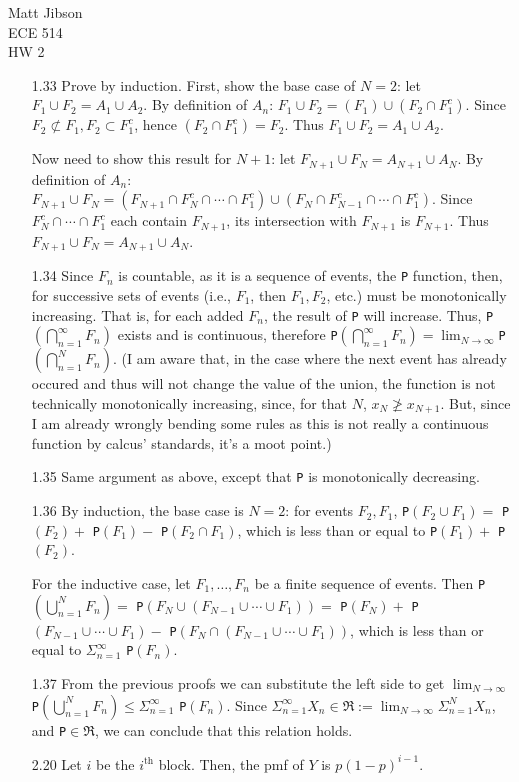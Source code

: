 \documentclass{article}
\begin{document}
\begin{flushright}
Matt Jibson \\
ECE 514 \\
HW 2
\end{flushright}

\begin{itemize}
	\item[1.33]
		Prove by induction. First, show the base case of $N=2$: let $F_1 \cup F_2 = A_1 \cup A_2$. By definition of $A_n$: $F_1 \cup F_2 = (F_1) \cup (F_2 \cap F_1^c)$. Since $F_2 \not \subset F_1, F_2 \subset F_1^c$, hence $(F_2 \cap F_1^c) = F_2$. Thus $F_1 \cup F_2 = A_1 \cup A_2$.

		Now need to show this result for $N+1$: let $F_{N+1} \cup F_N = A_{N+1} \cup A_N$. By definition of $A_n$: $F_{N+1} \cup F_N = (F_{N+1} \cap F_N^c \cap \cdots \cap F_1^c) \cup (F_N \cap F_{N-1}^c \cap \cdots \cap F_1^c)$. Since $F_N^c \cap \cdots \cap F_1^c$ each contain $F_{N+1}$, its intersection with $F_{N+1}$ is $F_{N+1}$. Thus $F_{N+1} \cup F_N = A_{N+1} \cup A_N$.
	\item[1.34]
		Since $F_n$ is countable, as it is a sequence of events, the \texttt{P} function, then, for successive sets of events (i.e., ${F_1}$, then ${F_1, F_2}$, etc.) must be monotonically increasing. That is, for each added $F_n$, the result of \texttt{P} will increase. Thus, \texttt{P}$(\bigcap_{n=1}^\infty F_n)$ exists and is continuous, therefore \texttt{P}$(\bigcap_{n=1}^\infty F_n) = \lim_{N \rightarrow \infty}$\texttt{P}$(\bigcap_{n=1}^N F_n)$. (I am aware that, in the case where the next event has already occured and thus will not change the value of the union, the function is not technically monotonically increasing, since, for that $N$, $x_N \not \ge x_{N+1}$. But, since I am already wrongly bending some rules as this is not really a continuous function by calcus' standards, it's a moot point.)
	\item[1.35]
		Same argument as above, except that \texttt{P} is monotonically decreasing.
	\item[1.36]
		By induction, the base case is $N=2$: for events $F_2, F_1$, \texttt{P}$(F_2 \cup F_1) =$ \texttt{P}$(F_2) +$ \texttt{P}$(F_1) -$ \texttt{P}$(F_2 \cap F_1)$, which is less than or equal to \texttt{P}$(F_1) +$ \texttt{P}$(F_2)$.

		For the inductive case, let $F_1, \dots, F_n$ be a finite sequence of events. Then \texttt{P}$(\bigcup_{n=1}^N F_n) =$ \texttt{P}$(F_N \cup (F_{N-1} \cup \cdots \cup F_1)) =$ \texttt{P}$(F_N) +$ \texttt{P}$(F_{N-1} \cup \cdots \cup F_1) -$ \texttt{P}$(F_N \cap (F_{N-1} \cup \cdots \cup F_1))$, which is less than or equal to $\Sigma_{n=1}^\infty$ \texttt{P}$(F_n)$.
	\item[1.37]
		From the previous proofs we can substitute the left side to get $\lim_{N \rightarrow \infty}$ \texttt{P}$(\bigcup_{n=1}^N F_n) \le \Sigma_{n=1}^\infty$ \texttt{P}$(F_n)$. Since $\Sigma_{n=1}^\infty X_n \in \Re := \lim_{N \rightarrow \infty} \Sigma_{n=1}^N X_n$, and \texttt{P}$ \in \Re$, we can conclude that this relation holds.
	\item[2.20]
		Let $i$ be the $i^\mathrm{th}$ block. Then, the pmf of $Y$ is $p (1-p)^{i-1}$.
\end{itemize}
\end{document}
